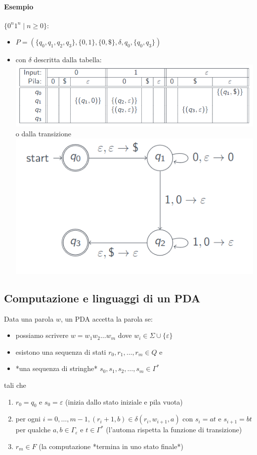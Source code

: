 \paragraph{Esempio}
 $\{0^n1^n\mid n\geq 0\}$:\\
\begin{itemize}
\item $P = (\{q_0, q_1, q_2, q_3\}, \{0,1\}, \{0,\$\}, \delta,q_0,\{q_0,q_3\})$ 
\item con $\delta$ descritta dalla tabella:
	\includegraphics[scale=0.5]{img/tabella_delta.png}
	o dalla transizione
	\includegraphics[scale=0.5]{img/transizione_delta.png}
\end{itemize}

\subsection{Computazione e linguaggi di un PDA}
Data una parola $w$, un PDA accetta la parola se:
\begin{itemize}
	\item possiamo scrivere $w = w_1w_2 \dots w_m$ dove $w_i \in \Sigma\cup \{\varepsilon\}$ 
	\item esistono una sequenza di stati $r_0, r_1,\dots, r_m \in Q$ e
	\item *una sequenza di stringhe* $s_0, s_1, s_2,\dots, s_m \in \Gamma^*$ 
\end{itemize}
\begin{center}
	tali che
\end{center}
\begin{enumerate}
	\item $r_0 = q_0$ e $s_0 = \varepsilon$ (inizia dallo stato iniziale e pila vuota)
	\item per ogni $i = 0, \dots, m - 1, (r_i+1, b) \in \delta(r_i , w_{i+1}, a)$ con $s_i = at$
		e $s_{i+1} = bt$ per qualche $a, b\in \Gamma_\varepsilon$ e $t\in\Gamma^*$ (l'automa rispetta la funzione
		di transizione)
	\item $r_m\in F$ (la computazione *termina in uno stato finale*)
\end{enumerate} 


